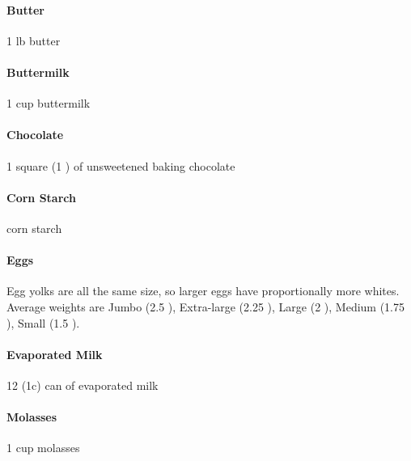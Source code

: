 \paragraph{Butter} 1 lb butter

\paragraph{Buttermilk} 1 cup buttermilk

\paragraph{Chocolate} 1 square (1 \oz) of unsweetened baking chocolate

\paragraph{Corn Starch} \half \T corn starch

\bwrap
\paragraph{Eggs} Egg yolks are all the same size, so larger eggs have
proportionally more whites. Average weights are Jumbo (2.5 \oz),
Extra-large (2.25 \oz), Large (2 \oz), Medium (1.75 \oz), Small (1.5 \oz).
\ewrap

\paragraph{Evaporated Milk} 12 \oz (1\half c) can of evaporated milk

\paragraph{Molasses} 1 cup molasses

